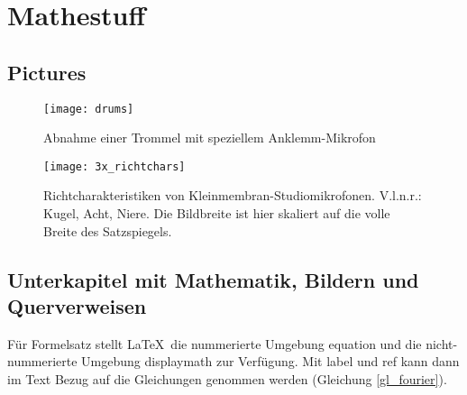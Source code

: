 

    \chapter{Mathestuff}

        \section{Pictures}

            \begin{figure}[htp]     %
                \centering
                \texttt{[image: drums]} 
                \caption{Abnahme einer Trommel mit speziellem Anklemm-Mikrofon}\label{trommelmik}
                \end{figure}
    
            \begin{figure}[htp]     %
                \centering
                \texttt{[image: 3x\_richtchars]}
                \caption[Richtcharakteristiken von Kleinmembran-Studiomikrofonen]{Richtcharakteristiken von Kleinmembran-Studiomikrofonen. V.l.n.r.: Kugel, Acht, Niere. Die Bildbreite ist hier skaliert auf die volle Breite des Satzspiegels.}\label{richtch}
                \end{figure}

        \section{Unterkapitel mit Mathematik, Bildern und Querverweisen}

            Für Formelsatz stellt \LaTeX\ die nummerierte Umgebung equation und die nicht-nummerierte Umgebung displaymath zur Verfügung. Mit label und ref kann dann im Text Bezug auf die Gleichungen genommen werden (Gleichung \ref{gl_fourier}). 

